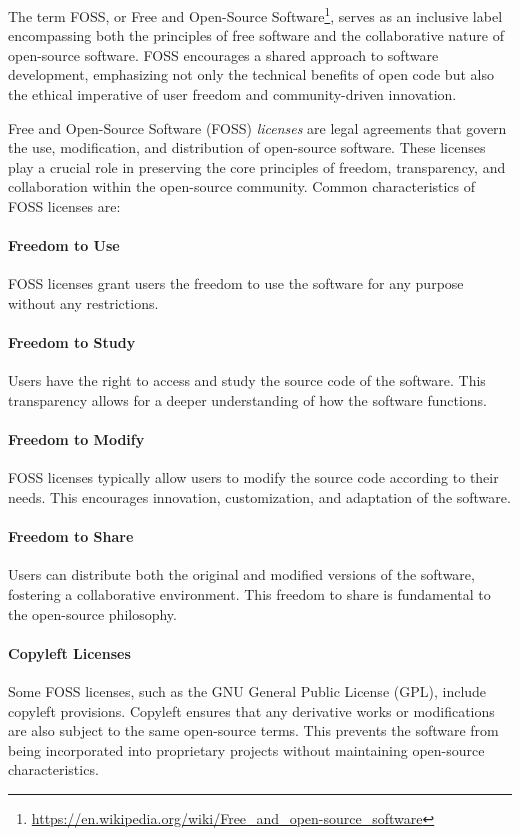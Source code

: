 The term FOSS, or Free and Open-Source Software\footnote{\url{https://en.wikipedia.org/wiki/Free_and_open-source_software}}, serves as an inclusive label encompassing both the principles of free software and the collaborative nature of open-source software. FOSS encourages a shared approach to software development, emphasizing not only the technical benefits of open code but also the ethical imperative of user freedom and community-driven innovation.

Free and Open-Source Software (FOSS) \emph{licenses} are legal agreements that govern the use, modification, and distribution of open-source software. These licenses play a crucial role in preserving the core principles of freedom, transparency, and collaboration within the open-source community. Common characteristics of FOSS licenses are:

\paragraph*{Freedom to Use} FOSS licenses grant users the freedom to use the software for any purpose without any restrictions.

\paragraph*{Freedom to Study} Users have the right to access and study the source code of the software. This transparency allows for a deeper understanding of how the software functions.

\paragraph*{Freedom to Modify} FOSS licenses typically allow users to modify the source code according to their needs. This encourages innovation, customization, and adaptation of the software.

\paragraph*{Freedom to Share} Users can distribute both the original and modified versions of the software, fostering a collaborative environment. This freedom to share is fundamental to the open-source philosophy.

\paragraph*{Copyleft Licenses} Some FOSS licenses, such as the GNU General Public License (GPL), include copyleft provisions. Copyleft ensures that any derivative works or modifications are also subject to the same open-source terms. This prevents the software from being incorporated into proprietary projects without maintaining open-source characteristics.

